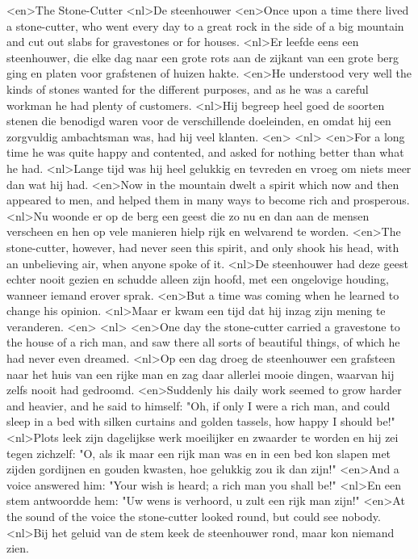 <en>The Stone-Cutter
<nl>De steenhouwer
<en>Once upon a time there lived a stone-cutter, who went every day to a great rock in the side of a big mountain and cut out slabs for gravestones or for houses.
<nl>Er leefde eens een steenhouwer, die elke dag naar een grote rots aan de zijkant van een grote berg ging en platen voor grafstenen of huizen hakte.
<en>He understood very well the kinds of stones wanted for the different purposes, and as he was a careful workman he had plenty of customers.
<nl>Hij begreep heel goed de soorten stenen die benodigd waren voor de verschillende doeleinden, en omdat hij een zorgvuldig ambachtsman was, had hij veel klanten.
<en>
<nl>
<en>For a long time he was quite happy and contented, and asked for nothing better than what he had.
<nl>Lange tijd was hij heel gelukkig en tevreden en vroeg om niets meer dan wat hij had.
<en>Now in the mountain dwelt a spirit which now and then appeared to men, and helped them in many ways to become rich and prosperous.
<nl>Nu woonde er op de berg een geest die zo nu en dan aan de mensen verscheen en hen op vele manieren hielp rijk en welvarend te worden.
<en>The stone-cutter, however, had never seen this spirit, and only shook his head, with an unbelieving air, when anyone spoke of it.
<nl>De steenhouwer had deze geest echter nooit gezien en schudde alleen zijn hoofd, met een ongelovige houding, wanneer iemand erover sprak.
<en>But a time was coming when he learned to change his opinion.
<nl>Maar er kwam een tijd dat hij inzag zijn mening te veranderen.
<en>
<nl>
<en>One day the stone-cutter carried a gravestone to the house of a rich man, and saw there all sorts of beautiful things, of which he had never even dreamed.
<nl>Op een dag droeg de steenhouwer een grafsteen naar het huis van een rijke man en zag daar allerlei mooie dingen, waarvan hij zelfs nooit had gedroomd.
<en>Suddenly his daily work seemed to grow harder and heavier, and he said to himself: "Oh, if only I were a rich man, and could sleep in a bed with silken curtains and golden tassels, how happy I should be!"
<nl>Plots leek zijn dagelijkse werk moeilijker en zwaarder te worden en hij zei tegen zichzelf: "O, als ik maar een rijk man was en in een bed kon slapen met zijden gordijnen en gouden kwasten, hoe gelukkig zou ik dan zijn!"
<en>And a voice answered him: "Your wish is heard; a rich man you shall be!"
<nl>En een stem antwoordde hem: "Uw wens is verhoord, u zult een rijk man zijn!"
<en>At the sound of the voice the stone-cutter looked round, but could see nobody.
<nl>Bij het geluid van de stem keek de steenhouwer rond, maar kon niemand zien.
